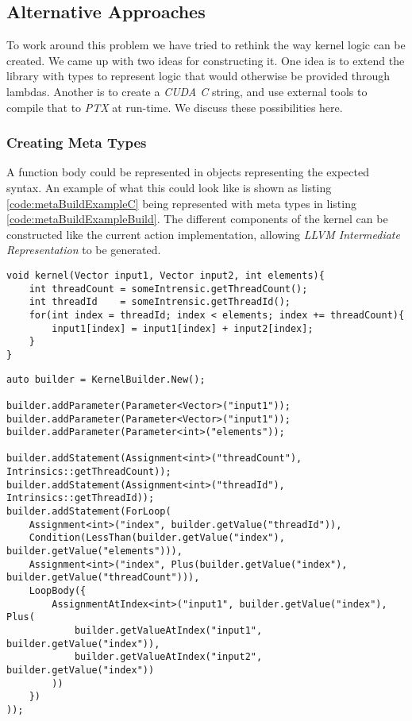 \subsection{Alternative Approaches}
To work around this problem we have tried to rethink the way kernel logic can be created. We came up with two ideas for constructing it. One idea is to extend the library with types to represent logic that would otherwise be provided through lambdas. Another is to create a \textit{CUDA C} string, and use external tools to compile that to \textit{PTX} at run-time. We discuss these possibilities here.

\subsubsection{Creating Meta Types}
A function body could be represented in objects representing the expected syntax. An example of what this could look like is shown as listing \ref{code:metaBuildExampleC} being represented with meta types in listing \ref{code:metaBuildExampleBuild}. The different components of the kernel can be constructed like the current action implementation, allowing \textit{LLVM Intermediate Representation} to be generated. 

\begin{lstlisting}[caption={Pseudo C code showing a kernel function.}, label={code:metaBuildExampleC}]
void kernel(Vector input1, Vector input2, int elements){
    int threadCount = someIntrensic.getThreadCount();
    int threadId    = someIntrensic.getThreadId();
    for(int index = threadId; index < elements; index += threadCount){
        input1[index] = input1[index] + input2[index];
    }
}
\end{lstlisting}

\begin{lstlisting}[caption={Code showing possible construction of kernel function in an meta type solution.}, label={code:metaBuildExampleBuild}]
auto builder = KernelBuilder.New();

builder.addParameter(Parameter<Vector>("input1"));
builder.addParameter(Parameter<Vector>("input1"));
builder.addParameter(Parameter<int>("elements"));

builder.addStatement(Assignment<int>("threadCount"), Intrinsics::getThreadCount));
builder.addStatement(Assignment<int>("threadId"), Intrinsics::getThreadId));
builder.addStatement(ForLoop(
    Assignment<int>("index", builder.getValue("threadId")),
    Condition(LessThan(builder.getValue("index"), builder.getValue("elements"))),
    Assignment<int>("index", Plus(builder.getValue("index"), builder.getValue("threadCount"))),
    LoopBody({
        AssignmentAtIndex<int>("input1", builder.getValue("index"), Plus(
            builder.getValueAtIndex("input1", builder.getValue("index")),
            builder.getValueAtIndex("input2", builder.getValue("index"))
        ))
    })
));
\end{lstlisting}

